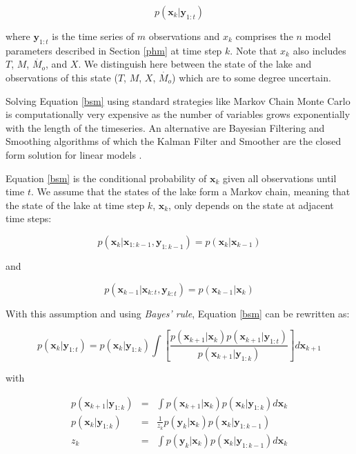 \documentclass{bmc_template/bmcart}
\newcommand{\bm}[1]{{\textbf{#1}}}
\begin{document}
\begin{equation}\label{bsm}
    p(\bm{x}_k|\bm{y}_{1:t})
\end{equation}

where $\bm{y}_{1:t}$ is the time series of $m$ observations and $x_k$ comprises
the $n$ model parameters described in Section \ref{phm} at time step $k$. Note
that $x_k$ also includes $T$, $M$, $\dot{M_o}$, and $X$. We distinguish here
between the state of the lake and observations of this state
($T$, $M$, $X$, $\dot{M_o}$) which are to some degree uncertain.

Solving Equation \ref{bsm} using standard strategies like Markov Chain Monte
Carlo is computationally very expensive as the number of variables grows
exponentially with the length of the timeseries. An alternative are Bayesian
Filtering and Smoothing algorithms of which the Kalman Filter and Smoother are
the closed form solution for linear models \cite{Kalman1960, Rauch1965,
sarkkaBayesianFilteringSmoothing2013}.

Equation \ref{bsm} is the conditional probability of $\bm{x}_k$ given all
observations until time $t$. We assume that the states of the lake form a
Markov chain, meaning that the state of the lake at time step $k$, $\bm{x}_k$,
only depends on the state at adjacent time steps:

\begin{equation}\label{markov1}
    p(\bm{x}_k|\bm{x}_{1:k-1}, \bm{y}_{1:k-1}) = p(\bm{x}_k|\bm{x}_{k-1})
\end{equation}

and

\begin{equation}\label{markov2}
    p(\bm{x}_{k-1}|\bm{x}_{k:t}, \bm{y}_{k:t}) = p(\bm{x}_{k-1}|\bm{x}_{k})
\end{equation}

With this assumption and using \textit{Bayes' rule}, Equation \ref{bsm} can be
rewritten \cite{sarkkaBayesianFilteringSmoothing2013} as:

\begin{equation}\label{bsm1}
p(\bm{x}_k|\bm{y}_{1:t}) = p(\bm{x}_k|\bm{y}_{1:k})
    \int\left[\frac{p(\bm{x}_{k+1}|\bm{x}_k)p(\bm{x}_{k+1}|\bm{y}_{1:t})}{p(\bm{x}_{k+1}|\bm{y}_{1:k})}\right]d\bm{x}_{k+1}
\end{equation}

with

\begin{eqnarray}\label{bfilt1}
p(\bm{x}_{k+1}|\bm{y}_{1:k}) & = & \int p(\bm{x}_{k+1}|\bm{x}_k)p(\bm{x}_k|\bm{y}_{1:k})d\bm{x}_k \\
        \label{bfilt}
    p(\bm{x}_k|\bm{y}_{1:k}) & = & \frac{1}{z_k} p(\bm{y}_k|\bm{x}_k)p(\bm{x}_k|\bm{y}_{1:k-1}) \\
        \label{zetk}
    z_k & = & \int p(\bm{y}_k|\bm{x}_k) p(\bm{x}_k| \bm{y}_{1:k-1}) d\bm{x}_k  
\end{eqnarray}
\end{document}
